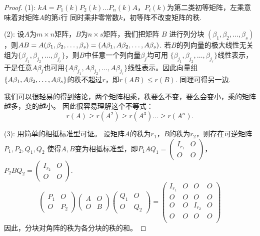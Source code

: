 \begin{proof}

	(1): $kA=P_1(k)P_2(k)\dots P_n(k) A$，$P_i(k)$为第二类初等矩阵，左乘意味着对矩阵$A$的第$i$行
	同时乘非零常数$k$，初等阵不改变矩阵的秩.

	(2): 设$A$为$m\times n$矩阵，$B$为$n \times s$矩阵，我们把矩阵 $B$ 进行列分块 
	$(\beta_1,\beta_2,\dots,\beta_s)$，则$AB=A(\beta_1,\beta_2,\dots,\beta_s)\\=
	(A\beta_1,A\beta_2,\dots,A\beta_s)$. 若$B$的列向量的极大线性无关组为$\{\beta_{j_1}
	,\beta_{j_2},\dots,\beta_{j_r}\}$，则$B$中任意一个列向量$\beta_j$均可用 $\{\beta_{j_1}
	,\beta_{j_2},\dots,\beta_{j_r}\}$线性表示，于是任意$A\beta_j$也可用$\{A\beta_{j_1}
	,A\beta_{j_2},\dots,A\beta_{j_r}\}$线性表示。因此向量组$\{A\beta_{1},A\beta_{2},
	\dots,\\A\beta_{s}\}$的秩不超过$r$，即$r(AB)\leq r(B)$. 同理可得另一边.

	\begin{remark}
		我们可以很轻易的得到结论，两个矩阵相乘，秩要么不变，要么会变小，乘的矩阵越多，变的越小。
		因此很容易理解这个不等式：
		$$
			r(A) \geq r(A^2) \geq r(A^3) \dots \geq r(A^n).
		$$
	\end{remark}

	(3): 用简单的相抵标准型可证。 设矩阵$A$的秩为$r_1$，$B$的秩为$r_2$，则存在可逆矩阵$P_1,P_2,Q_1,Q_2$
	使得$A,B$变为相抵标准型，即$P_1AQ_1=\begin{pmatrix}
		I_{r_1} & O \\
		O & O
	\end{pmatrix}$，$P_2BQ_2=\begin{pmatrix}
		I_{r_2} & O \\
		O & O
	\end{pmatrix}$.
	$$
		\begin{pmatrix}
			P_1 & O \\
			O & P_2
		\end{pmatrix} 
		\begin{pmatrix}
			A & O \\
			O & B
		\end{pmatrix} 
		\begin{pmatrix}
			Q_1 & O \\
			O & Q_2
		\end{pmatrix} = 
		\begin{pmatrix}
			I_{r_1} & O & O & O \\
			O & O & O & O \\
			O & O & I_{r_2} & O \\
			O & O & O & O \\
		\end{pmatrix}
	$$
	因此，分块对角阵的秩为各分块的秩的和。


\end{proof}

